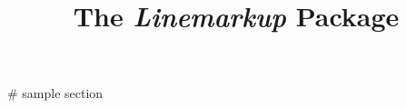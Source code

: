 \documentclass{article}
\begin{document}
\title{The \textit{Linemarkup} Package}

# sample section
\end{document}
